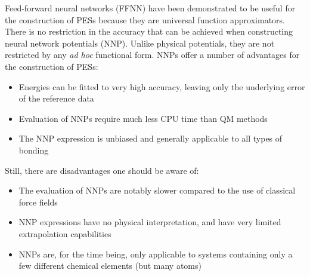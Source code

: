 \documentclass[twoside,english]{uiofysmaster}
\begin{document}
Feed-forward neural networks (FFNN) have been demonstrated to be useful for the construction of PESs because
they are universal function approximators. There is no restriction in the accuracy that can be achieved when 
constructing neural network potentials (NNP). Unlike physical potentials, they are not restricted by any \textit{ad hoc}
functional form. NNPs offer a number of advantages for the construction of PESs:
\begin{itemize}
 \item Energies can be fitted to very high accuracy, leaving only
 the underlying error of the reference data
 \item Evaluation of NNPs require much less CPU time than QM methods
 \item The NNP expression is unbiased and generally applicable to all types of bonding
\end{itemize}
Still, there are disadvantages one should be aware of:
\begin{itemize}
 \item The evaluation of NNPs are notably slower compared to the use of classical force fields
 \item NNP expressions have no physical interpretation, and have very limited extrapolation capabilities
 \item NNPs are, for the time being, only applicable to systems containing only a few
 different chemical elements (but many atoms)
\end{itemize}
\end{document}
